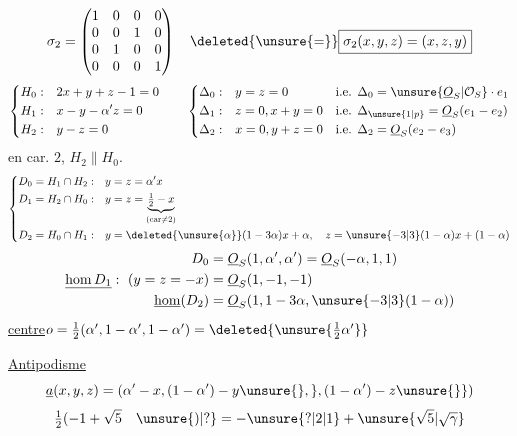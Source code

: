 \[
\sigma_2=\begin{pmatrix}1&0&0&0\\0&0&1&0\\0&1&0&0\\0&0&0&1\end{pmatrix}
\quad\deleted{\unsure{=}}\boxed{\sigma_2(x,y,z)=(x,z,y)}
\]
\[
\left\{\begin{aligned}
H_0:&\quad2x+y+z-1=0\\H_1:&\quad x-y-\alpha'z=0\\H_2:&\quad y-z=0
\end{aligned}\right.
\qquad\left\{\begin{aligned}
\Delta_0:&\quad y=z=0&&\text{i.e. }\Delta_0=\unsure{\underline O_S|\mathcal O_S}\cdot e_1\\
\Delta_1:&\quad z=0,x+y=0&&\text{i.e. }\Delta_{\unsure{1|p}}=\underline O_S(e_1-e_2)\\
\Delta_2:&\quad x=0,y+z=0&&\text{i.e. }\Delta_2=\underline O_S(e_2-e_3)
\end{aligned}\right.
\]
en car. $2$, $H_2\parallel H_0$.
\[
\left\{\begin{aligned}
D_0=H_1\cap H_2:&\quad y=z=\alpha'x\\
D_1=H_2\cap H_0:&\quad y=z=\underbrace{\tfrac12-x}_{\text{(car}\ne2\text{)}}\\
D_2=H_0\cap H_1:&\quad y=\deleted{\unsure{\alpha}}(1-3\alpha)x+\alpha,\quad z=\unsure{-3|3}(1-\alpha)x+(1-\alpha)
\end{aligned}\right.
\]
\[
\begin{aligned}
D_0&=\underline O_S(1,\alpha',\alpha')=\underline O_S(-\alpha,1,1)\\
\underline{\mathrm{hom}\,D_1}:\ (y=z=-x)&=\underline O_S(1,-1,-1)\\
\underline{\mathrm{hom}}(D_2)&=\underline O_S(1,1-3\alpha,\unsure{-3|3}(1-\alpha))
\end{aligned}
\]
\uline{centre}\quad $o=\frac12(\alpha',1-\alpha',1-\alpha')=\deleted{\unsure{\frac12\alpha'}}$

\uline{Antipodisme}
\[
\underline a(x,y,z)=(\alpha'-x,(1-\alpha')-y\unsure{\},},(1-\alpha')-z\unsure{\}})
\]
\[
\tfrac12(-1+\sqrt5\quad\unsure{)|?}=-\unsure{?|2|1}+\unsure{\sqrt5|\sqrt\gamma}
\]

